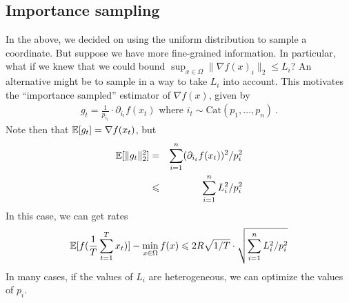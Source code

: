 	\subsection{Importance sampling}
	In the above, we decided on using the uniform distribution to sample a
  coordinate. But suppose we have more fine-grained information. In particular, what if we knew that we could bound $\sup_{x \in \Omega} \|\nabla f(x)_i\|_2 \le L_i$? An alternative might be to sample in a way to take $L_i$ into account. This motivates the ``importance sampled'' estimator of $\nabla f(x)$, given by
	\begin{eqnarray}
	g_t = \frac{1}{p_{i_t}} \cdot \partial_{i_t}f(x_{t}) \text{ where } i_t \sim
    \mathrm{Cat}(p_1,\dots,p_n) \ .
	\end{eqnarray}
	Note then that $\operatorname*{\mathbb{E}}[g_t] = \nabla f(x_t)$, but
	\begin{eqnarray}
    \operatorname*{\mathbb{E}}[\|g_t\|^2_2]
    &=& \sum_{i=1}^n (\partial_{i_t}f(x_{t}))^2/p_i^2\\
    &\leqslant& \sum_{i=1}^n L_i^2/p_i^2
	\end{eqnarray}
	In this case, we can get rates 
	\begin{eqnarray}
	  \operatorname*{\mathbb{E}}[f(\frac{1}{T}\sum_{t=1}^T x_t)] - \min_{x \in \Omega}f(x)
    \leqslant 2R\sqrt{1/T}\cdot \sqrt{\sum_{i=1}^n L_i^2/p_i^2}
	\end{eqnarray}
	In many cases, if the values of $L_i$ are heterogeneous, we can optimize the values of $p_i$. 
